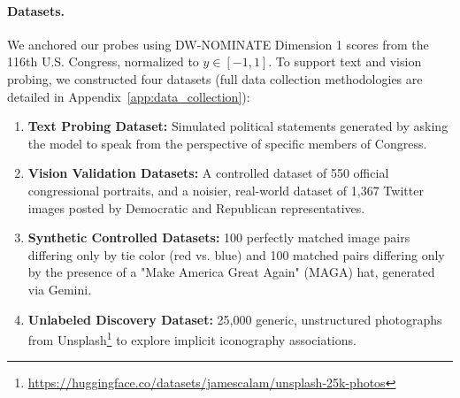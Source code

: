 \documentclass{article}
\begin{document}
\paragraph{Datasets.}
We anchored our probes using DW-NOMINATE Dimension 1 scores from the 116th U.S. Congress, normalized to $y \in [-1, 1]$. To support text and vision probing, we constructed four datasets (full data collection methodologies are detailed in Appendix~\ref{app:data_collection}):
\begin{enumerate}
    \item \textbf{Text Probing Dataset:} Simulated political statements generated by asking the model to speak from the perspective of specific members of Congress.
    \item \textbf{Vision Validation Datasets:} A controlled dataset of 550 official congressional portraits, and a noisier, real-world dataset of 1,367 Twitter images posted by Democratic and Republican representatives.
    \item \textbf{Synthetic Controlled Datasets:} 100 perfectly matched image pairs differing only by tie color (red vs. blue) and 100 matched pairs differing only by the presence of a "Make America Great Again" (MAGA) hat, generated via Gemini.
    \item \textbf{Unlabeled Discovery Dataset:} 25,000 generic, unstructured photographs from Unsplash\footnote{\url{https://huggingface.co/datasets/jamescalam/unsplash-25k-photos}} to explore implicit iconography associations.
\end{enumerate}
\end{document}
